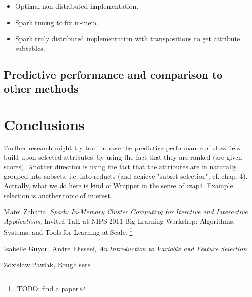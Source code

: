 \documentclass[12pt]{pracamgr}
\begin{document}
\begin{itemize}
  \item Optimal non-distributed implementation.
  \item Spark tuning to fix in-mem.
  \item Spark truly distributed implementation with transpositions to get attribute
        subtables.
\end{itemize}


\section{Predictive performance and comparison to other methods}

\chapter{Conclusions}

Further research might try too increase the predictive performance of classifiers build upon
selected attributes, by using the fact that they are ranked (are given scores). Another 
direction is using the fact that the attributes are in naturally grouped into subsets, i.e.
into reducts (and achieve "subset selection", cf. \cite{guyon} chap. 4). Actually, what we
do here is kind of Wrapper in the sense of czap4. Example selection is another topic of interest.

\begin{thebibliography}{9}

 Matei Zaharia, \emph{Spark: In-Memory Cluster Computing for Iterative and
                  Interactive Applications}, Invited Talk at NIPS 2011 Big Learning
                  Workshop: Algorithms, Systems, and Tools for Learning at Scale.
                  \footnote{[TODO: find a paper]}
                  
 Isabelle Guyon, Andre Elisseef, \emph{An Introduction to Variable and
                Feature Selection}
                
 Zdzis\l{}aw Pawlak, Rough sets

\end{thebibliography}
\end{document}
